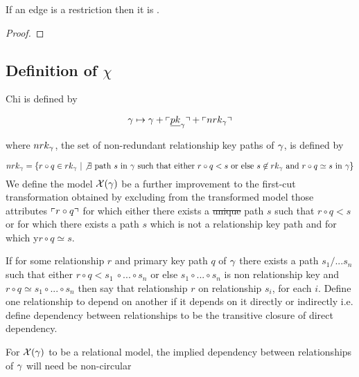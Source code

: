 \begin{lemma}
If an edge is a restriction then it is .
\end{lemma}
\begin{proof}
\tbd
\end{proof}

\subsection{Definition of $\chi$}

Chi is defined by 

\begin{equation}
\label{chidefinition}
\gamma \mapsto \gamma + \left\ulcorner\underline{pk}_\gamma\right\urcorner + \left\ulcorner nrk_{\gamma}\right\urcorner
\end{equation}

where $nrk_{\gamma}$, the set of non-redundant relationship key paths of $\gamma$, is defined by

\begin{equation*}
nrk_{\gamma} = \left\{r \circ q \in rk_{\gamma} \ \middle|\ \not \exists \text{ path } s \text{ in } \gamma
               \text{  such that either } r \circ q < s \text{ or else } s \not \in rk_{\gamma} \text{ and }
							     r \circ q \simeq s \text{ in } \gamma\right\}
\end{equation*}
We define the model $\mathcal{X}(\gamma)$  \index[definitions]{$\chi$}  be a further improvement to the first-cut transformation obtained by excluding  from  the transformed model those attributes $\left\ulcorner r \circ q\right\urcorner$ for which either there exists a \sout{unique}  path $s$ such that  $r \circ q < s$ or for which there exists a path $s$ which is not a relationship key path and 
for which y$r \circ q \simeq s$.

\begin{definition}
If for some relationship $r$ and primary key path $q$ of $\gamma$ there exists a  path $s_1/...s_n$ such that 
either   $r \circ q < s_1\ \circ ... \circ s_n$ 
or else $s_1 \circ ... \circ s_n$ is non relationship key and $r \circ q \simeq s_1 \circ ... \circ s_n$ then say that relationship $r$  on relationship $s_i$,
for each $i$. Define one relationship to depend on another if it depends on it directly or indirectly i.e. define dependency between relationships to be the transitive closure of direct dependency.
\end{definition}

For $\mathcal{X}(\gamma)$ to be a relational model, the implied dependency between relationships of $\gamma$ will need be non-circular



